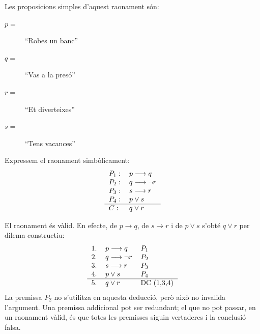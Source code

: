 \begin{solucio}
Les proposicions simples d'aquest raonament són:

\begin{description}
\item[$p=$] \enquote{Robes un banc}

\item[$q=$] \enquote{Vas a la presó}

\item[$r=$] \enquote{Et diverteixes}

\item[$s=$] \enquote{Tens vacances}
\end{description}

Expressem el raonament simbòlicament:
\begin{equation*}
\begin{tabular}{ll}
$P_{1}:$ & $p\longrightarrow q$ \\
$P_{2}:$ & $q\longrightarrow\lnot r$ \\
$P_{3}:$ & $s\longrightarrow r$ \\
$P_{4}:$ & $p\vee s$ \\ \hline
$C:$ & $q\vee r$\end{tabular}
\end{equation*}

El raonament és vàlid. En efecte, de $p\longrightarrow q$, de
$s\longrightarrow r$ i de $p\vee s$ s'obté $q\vee r$ per dilema constructiu:
\begin{equation*}
\begin{tabular}{lll}
1. & $p\longrightarrow q$ & $P_{1}$ \\
2. & $q\longrightarrow\lnot r$ & $P_{2}$ \\
3. & $s\longrightarrow r$ & $P_{3}$ \\
4. & $p\vee s$ & $P_{4}$ \\ \hline
5. & $q\vee r$ & DC (1,3,4)\end{tabular}
\end{equation*}
La premissa $P_{2}$ no s'utilitza en aquesta deducció, però això no invalida
l'argument. Una premissa addicional pot ser redundant; el que no pot passar,
en un raonament vàlid, és que totes les premisses siguin vertaderes i la
conclusió falsa.
\end{solucio}

\bigskip

